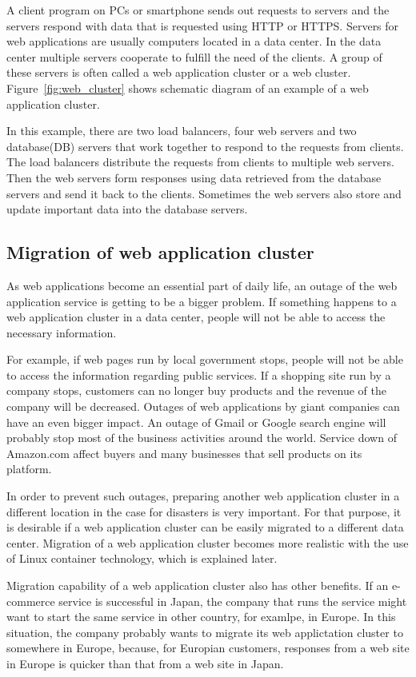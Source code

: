 A client program on PCs or smartphone sends out requests to servers and the servers respond with data that is requested using HTTP or HTTPS. 
Servers for web applications are usually computers located in a data center.
In the data center multiple servers cooperate to fulfill the need of the clients.
A group of these servers is often called a web application cluster or a web cluster.
Figure~\ref{fig:web_cluster} shows schematic diagram of an example of a web application cluster.

In this example, there are two load balancers, four web servers and two database(DB) servers that work together to respond to the requests from clients.
The load balancers distribute the requests from clients to multiple web servers.
Then the web servers form responses using data retrieved from the database servers and send it back to the clients.
Sometimes the web servers also store and update important data into the database servers.

\subsection{Migration of web application cluster}

As web applications become an essential part of daily life, an outage of the web application service is getting to be a bigger problem.
If something happens to a web application cluster in a data center, people will not be able to access the necessary information.

For example, if web pages run by local government stops, people will not be able to access the information regarding public services.
If a shopping site run by a company stops, customers can no longer buy products and the revenue of the company will be decreased.
Outages of web applications by giant companies can have an even bigger impact.
An outage of Gmail or Google search engine will probably stop most of the business activities around the world.
Service down of Amazon.com affect buyers and many businesses that sell products on its platform.

In order to prevent such outages, preparing another web application cluster in a different location in the case for disasters is very important.
For that purpose, it is desirable if a web application cluster can be easily migrated to a different data center.
Migration of a web application cluster becomes more realistic with the use of Linux container technology, which is explained later.

Migration capability of a web application cluster also has other benefits.
If an e-commerce service is successful in Japan, the company that runs the service might want to start the same service in other country, for examlpe, in Europe.
In this situation, the company probably wants to migrate its web applictation cluster to somewhere in Europe, because, for Europian customers, responses from a web site in Europe is quicker than that from a web site in Japan.

